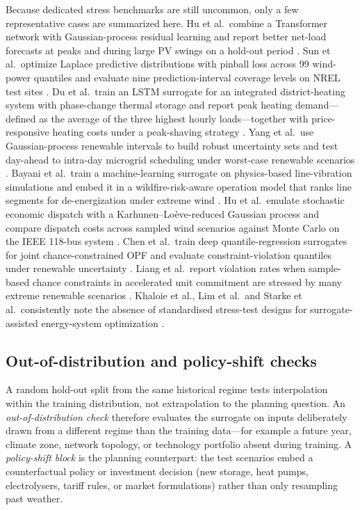 Because dedicated stress benchmarks are still uncommon, only a few
representative cases are summarized here. Hu et al.\ combine a
Transformer network with Gaussian-process residual learning and report
better net-load forecasts at peaks and during large PV swings on a
hold-out period \cite{Hu2024}. Sun et al.\ optimize Laplace predictive
distributions with pinball loss across 99 wind-power quantiles and
evaluate nine prediction-interval coverage levels on NREL test sites
\cite{Sun20191497}. Du et al.\ train an LSTM surrogate for an
integrated district-heating system with phase-change thermal storage
and report peak heating demand---defined as the average of the three
highest hourly loads---together with price-responsive heating costs
under a peak-shaving strategy \cite{Du2025}. Yang et al.\ use
Gaussian-process renewable intervals to build robust uncertainty sets
and test day-ahead to intra-day microgrid scheduling under worst-case
renewable scenarios \cite{Yang2024__2}. Bayani et al.\ train a
machine-learning surrogate on physics-based line-vibration simulations
and embed it in a wildfire-risk-aware operation model that ranks line
segments for de-energization under extreme wind
\cite{Bayani20231024}. Hu et al.\ emulate stochastic economic
dispatch with a Karhunen--Lo\`eve-reduced Gaussian process and
compare dispatch costs across sampled wind scenarios against Monte
Carlo on the IEEE 118-bus system \cite{Hu2020}. Chen et al.\ train
deep quantile-regression surrogates for joint chance-constrained OPF
and evaluate constraint-violation quantiles under renewable
uncertainty \cite{Chen2023657}. Liang et al.\ report violation rates
when sample-based chance constraints in accelerated unit commitment
are stressed by many extreme renewable scenarios
\cite{Liang20246508}. Khaloie et al., Lim et al.\ and Starke et al.\
consistently note the absence of standardised stress-test designs for
surrogate-assisted energy-system optimization
\cite{Khaloie2025,Lim2025,Starke2025214}.

\subsection{Out-of-distribution and policy-shift checks}
\label{sec:val:ood}

A random hold-out split from the same historical regime tests
interpolation within the training distribution, not extrapolation to
the planning question. An
\emph{out-of-distribution check} therefore evaluates the surrogate on
inputs deliberately drawn from a different regime than the training
data---for example a future year, climate zone, network topology, or
technology portfolio absent during training. A \emph{policy-shift
block} is the planning counterpart: the test scenarios embed a
counterfactual policy or investment decision (new storage, heat pumps,
electrolysers, tariff rules, or market formulations) rather than only
resampling past weather.

